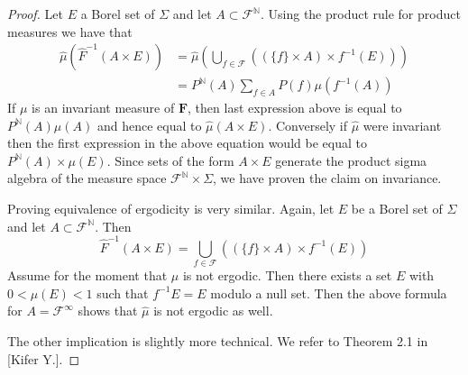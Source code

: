 \documentclass[pdftex,11pt,a4paper,oneside]{article}
\theoremstyle{plain}
\begin{document}
\begin{proof}
Let $E$ a Borel set of $\Sigma$ and let $A\subset \mathcal{F}^{\mathbb{N}}$. Using the product rule for product measures we have that
\begin{equation}
    \begin{split}
            \hat{\mu}\left(\hat{F}^{-1}(A\times E)\right) &= \hat{\mu}\left(\bigcup_{f\in\mathcal{F}}\left((\{f\}\times A) \times f^{-1}(E)\right)\right) \\
    &=P^{\mathbb{N}}(A)\sum_{f\in A} P(f)\mu(f^{-1}(A))
    \end{split}
\end{equation}
If $\mu$ is an invariant measure of $\mathbf{F}$, then last expression above is equal to $P^{\mathbb{N}}(A)\mu(A)$ and hence equal to $\hat{\mu}(A\times E)$. Conversely if $\hat{\mu}$ were invariant then the first expression in the above equation would be equal to $P^{\mathbb{N}}(A)\times \mu(E)$. Since sets of the form $A\times E$ generate the product sigma algebra of the measure space $\mathcal{F}^{\mathbb{N}}\times \Sigma$, we have proven the claim on invariance.

Proving equivalence of ergodicity is very similar. Again, let $E$  be a Borel set of $\Sigma$ and let $A\subset \mathcal{F}^{\mathbb{N}}$. Then 
\[\hat{F}^{-1}(A\times E) = \bigcup_{f\in\mathcal{F}}\left((\{f\}\times A) \times f^{-1}(E)\right)\]
Assume for the moment that $\mu$ is not ergodic. Then there exists a set $E$ with $0<\mu(E)<1$ such that $f^{-1}E = E$ modulo a null set. Then the above formula for $A=\mathcal{F}^\infty $ shows that $\hat{\mu}$ is not ergodic as well. 

The other implication is slightly more technical. We refer to Theorem 2.1 in [Kifer Y.].
\end{proof}
\end{document}

